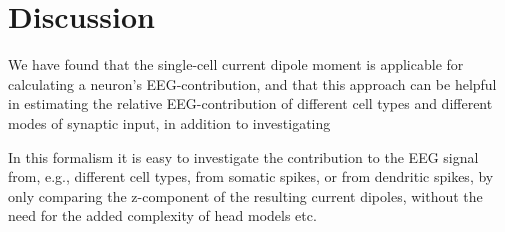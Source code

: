 \documentclass[preprint,10pt,authoryear]{elsarticle}
\newcommand{\hlg}[2][Emerald]{ {\sethlcolor{#1} \hl{#2}} }
\newcommand{\tvnnote}[1]{\color{white}{\hlg{TVN: #1 }}\color{black}}
\begin{document}
\section{Discussion}\label{sec:discussion}


We have found that the single-cell current dipole moment is applicable for calculating a neuron's EEG-contribution, and that this approach can be helpful in estimating the relative EEG-contribution of different cell types and different modes of synaptic input, in addition to investigating 

In this formalism it is easy to investigate the contribution to the EEG signal from, e.g., different cell types, from somatic spikes, or from dendritic spikes, by only comparing the z-component of the resulting current dipoles, without the need for the added complexity of head models etc.
\end{document}
